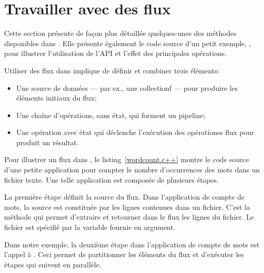 \section{Travailler avec des flux}

Cette section pr\'esente de fa\c{c}on plus d\'etaill\'ee quelques-unes des m\'ethodes disponibles dans \PpFf. Elle pr\'esente \'egalement le code source d'un petit exemple, , pour illustrer l'utilisation de l'API et l'effet des principales op\'erations. 

Utiliser des flux dans \PpFf{} implique de d\'efinir et combiner trois \'el\'ements: 
\begin{itemize}
	\item Une source de donn\'ees --- par ex., une collectionf --- pour produire les \'el\'ements initiaux du flux;

	\item Une cha\^ine d'op\'erations, sans \'etat, qui forment un pipeline;

	\item Une op\'eration avec \'etat qui d\'eclenche l'ex\'ecution des op\'erationss flux pour produit un r\'esultat.
\end{itemize}

Pour illustrer un flux dans \PpFf, le listing~\ref{wordcount.c++} montre le code source d'une petite application pour compter le nombre d'occurrences des mots dans un fichier texte. Une telle application est compos\'ee de plusieurs \'etapes. 

La premi\`ere \'etape d\'efinit la source du flux. Dans l'application de compte de mots, la source est constitu\'ee par les lignes contenues dans un fichier. C'est la m\'ethode  qui permet d'extraire et retourner dans le flux les lignes du fichier. Le fichier est sp\'ecifi\'e par la variable  fournie en argument. 

Dans notre exemple, la deuxi\`eme \'etape dans l'application de compte de mots est l'appel \`a . Ceci permet de partitionner les \'el\'ements du flux et d'ex\'ecuter les \'etapes qui suivent en parall\`ele. 

